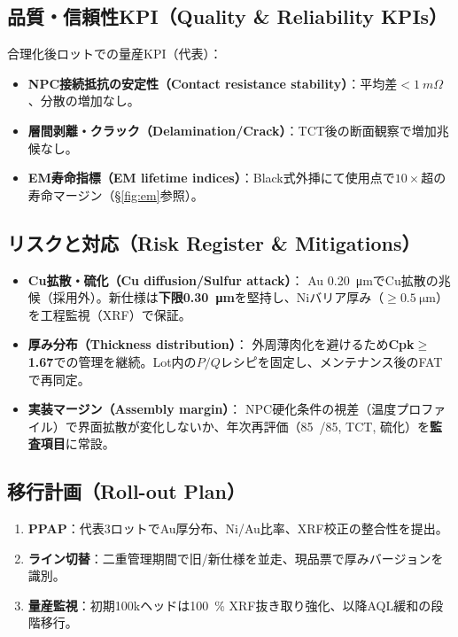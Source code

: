 \documentclass[conference]{IEEEtran}
\begin{document}
\subsection{品質・信頼性KPI（Quality \& Reliability KPIs）}
合理化後ロットでの量産KPI（代表）：
\begin{itemize}
  \item \textbf{NPC接続抵抗の安定性（Contact resistance stability）}：平均差$<\SI{1}{m\Omega}$、分散の増加なし。
  \item \textbf{層間剥離・クラック（Delamination/Crack）}：TCT後の断面観察で増加兆候なし。
  \item \textbf{EM寿命指標（EM lifetime indices）}：Black式外挿にて使用点で$10\times$超の寿命マージン（\S\ref{fig:em}参照）。
\end{itemize}

\subsection{リスクと対応（Risk Register \& Mitigations）}
\begin{itemize}
  \item \textbf{Cu拡散・硫化（Cu diffusion/Sulfur attack）}：
  Au \SI{0.20}{\micro\meter}でCu拡散の兆候（採用外）。新仕様は\textbf{下限\SI{0.30}{\micro\meter}}を堅持し、Niバリア厚み（$\ge\SI{0.5}{\micro\meter}$）を工程監視（XRF）で保証。
  \item \textbf{厚み分布（Thickness distribution）}：
  外周薄肉化を避けるため\textbf{Cpk$\ge$1.67}での管理を継続。Lot内の$P\!/\!Q$レシピを固定し、メンテナンス後のFATで再同定。
  \item \textbf{実装マージン（Assembly margin）}：
  NPC硬化条件の視差（温度プロファイル）で界面拡散が変化しないか、年次再評価（\SI{85}{/}\SI{85}{}, TCT, 硫化）を\textbf{監査項目}に常設。
\end{itemize}

\subsection{移行計画（Roll-out Plan）}
\begin{enumerate}
  \item \textbf{PPAP}：代表3ロットでAu厚分布、Ni/Au比率、XRF校正の整合性を提出。
  \item \textbf{ライン切替}：二重管理期間で旧/新仕様を並走、現品票で厚みバージョンを識別。
  \item \textbf{量産監視}：初期100kヘッドは\SI{100}{\%} XRF抜き取り強化、以降AQL緩和の段階移行。
\end{enumerate}
\end{document}
